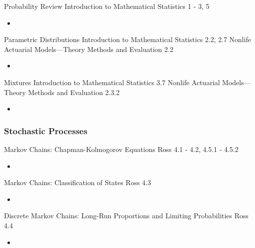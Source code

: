 \documentclass[12pt, titlepage, french]{report}
\begin{document}
\begin{CHPT_SUMM_AUTO_NUMB}[label = {L.-1}]{Probability Review}
Introduction to Mathematical Statistics 1 - 3, 5
	\begin{itemize}
		\item	
	\end{itemize}
\end{CHPT_SUMM_AUTO_NUMB}

\begin{CHPT_SUMM_AUTO_NUMB}[label = {L.-2}]{Parametric Distributions}
Introduction to Mathematical Statistics 2.2, 2.7
Nonlife Actuarial Models---Theory Methods and Evaluation 2.2
	\begin{itemize}
		\item	
	\end{itemize}
\end{CHPT_SUMM_AUTO_NUMB}

\begin{CHPT_SUMM_AUTO_NUMB}[label = {L.-3}]{Mixtures}
Introduction to Mathematical Statistics 3.7
Nonlife Actuarial Models---Theory Methods and Evaluation 2.3.2
	\begin{itemize}
		\item	
	\end{itemize}
\end{CHPT_SUMM_AUTO_NUMB}

\subsubsection*{Stochastic Processes}

\begin{CHPT_SUMM_AUTO_NUMB}[label = {L.-4}]{Markov Chains: Chapman-Kolmogorov Equations}
Ross 4.1 - 4.2, 4.5.1 - 4.5.2
	\begin{itemize}
		\item	
	\end{itemize}
\end{CHPT_SUMM_AUTO_NUMB}

\begin{CHPT_SUMM_AUTO_NUMB}[label = {L.-5}]{Markov Chains: Classification of States}
Ross 4.3
	\begin{itemize}
		\item	
	\end{itemize}
\end{CHPT_SUMM_AUTO_NUMB}

\begin{CHPT_SUMM_AUTO_NUMB}[label = {L.-6}]{Discrete Markov Chains: Long-Run Proportions and Limiting Probabilities}
Ross 4.4
	\begin{itemize}
		\item	
	\end{itemize}
\end{CHPT_SUMM_AUTO_NUMB}
\end{document}
